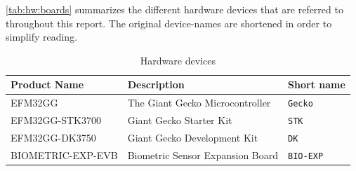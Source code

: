\autoref{tab:hw:boards} summarizes the different hardware devices that are referred to throughout this report.
The original device-names are shortened in order to simplify reading.

\begin{table}[H]
  \begin{tabular}{l|l|l}
    \textbf{Product Name} & \textbf{Description} & \textbf{Short name} \\
    \hline
    EFM32GG & The Giant Gecko Microcontroller & \texttt{Gecko} \\
    EFM32GG-STK3700 & Giant Gecko Starter Kit & \texttt{STK} \\
    EFM32GG-DK3750 & Giant Gecko Development Kit & \texttt{DK} \\
    BIOMETRIC-EXP-EVB & Biometric Sensor Expansion Board & \texttt{BIO-EXP} \\
    \hline
  \end{tabular}
  \caption{Hardware devices}
  \label{tab:hw:boards}
\end{table}

